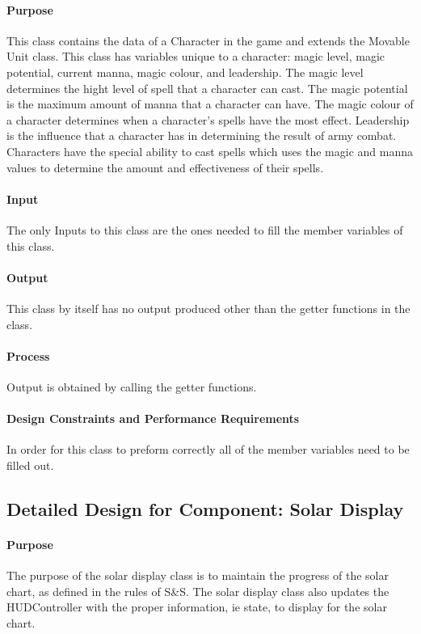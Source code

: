 \documentclass[12pt,a4paper,titlepage]{article}
\begin{document}
\paragraph{Purpose} This class contains the data of a Character in the game and extends the Movable Unit class. This class has variables unique to a character: magic level, magic potential, current manna, magic colour, and leadership. The magic level determines the hight level of spell that a character can cast. The magic potential is the maximum amount of manna that a character can have. The magic colour of a character determines when a character's spells have the most effect. Leadership is the influence that a character has in determining the result of army combat. Characters have the special ability to cast spells which uses the magic and manna values to determine the amount and effectiveness of their spells. 
\paragraph{Input} The only Inputs to this class are the ones needed to fill the member variables of this class.
\paragraph{Output} This class by itself has no output produced other than the getter functions in the class.
\paragraph{Process} Output is obtained by calling the getter functions. 
\paragraph{Design Constraints and Performance Requirements} In order for this class to preform correctly all of the member variables need to be filled out.

\subsection{Detailed Design for Component: Solar Display}
\paragraph{Purpose} The purpose of the solar display class is to maintain the progress of the solar chart, as defined in the rules of S\&S. The solar display class also updates the HUDController with the proper information, ie state, to display for the solar chart.
\end{document}

